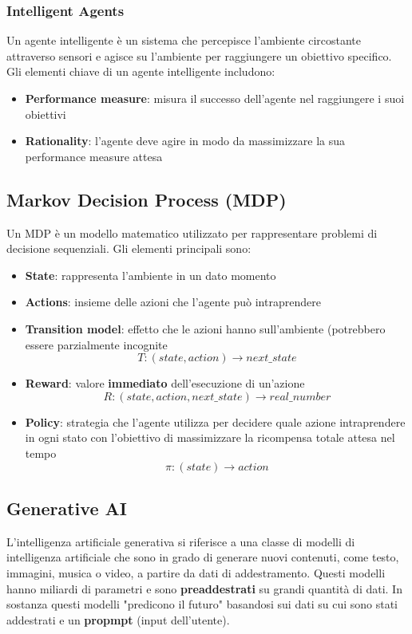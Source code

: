 \documentclass[a4paper]{article}
\begin{document}
\subsubsection{Intelligent Agents}
Un agente intelligente è un sistema che percepisce l'ambiente circostante attraverso sensori e agisce su
l'ambiente per raggiungere un obiettivo specifico. Gli elementi chiave di un agente intelligente includono:
\begin{itemize}
  \item \textbf{Performance measure}: misura il successo dell'agente nel raggiungere i suoi obiettivi
  \item \textbf{Rationality}: l'agente deve agire in modo da massimizzare la sua performance measure attesa
\end{itemize}

\subsection{Markov Decision Process (MDP)}
Un MDP è un modello matematico utilizzato per rappresentare problemi di decisione sequenziali. Gli elementi
principali sono:
\begin{itemize}
  \item \textbf{State}: rappresenta l'ambiente in un dato momento
  \item \textbf{Actions}: insieme delle azioni che l'agente può intraprendere
  \item \textbf{Transition model}: effetto che le azioni hanno sull'ambiente (potrebbero essere parzialmente incognite
    \[
      T: (state, action) \to next\_state
    \] 
  \item \textbf{Reward}: valore \textbf{immediato} dell'esecuzione di un'azione
    \[
      R: (state, action, next\_state) \to real\_number
    \] 
  \item \textbf{Policy}: strategia che l'agente utilizza per decidere quale azione intraprendere in ogni stato
    con l'obiettivo di massimizzare la ricompensa totale attesa nel tempo
    \[
      \pi: (state) \to action
    \] 
\end{itemize}

\subsection{Generative AI}
L'intelligenza artificiale generativa si riferisce a una classe di modelli di intelligenza artificiale
che sono in grado di generare nuovi contenuti, come testo, immagini, musica o video, a partire da dati di
addestramento. Questi modelli hanno miliardi di parametri e sono \textbf{preaddestrati} su grandi quantità
di dati. In sostanza questi modelli "predicono il futuro" basandosi sui dati su cui sono stati addestrati e
un \textbf{propmpt} (input dell'utente).
\end{document}
